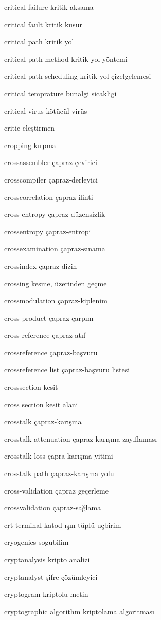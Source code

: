\documentclass[12pt,fleqn]{article}\usepackage{../../common}
\begin{document}
critical failure kritik aksama

critical fault kritik kusur

critical path kritik yol

critical path method kritik yol yöntemi

critical path scheduling kritik yol çizelgelemesi

critical temprature bunalgi sicakligi

critical virus kötücül virüs

critic eleştirmen

cropping kırpma

crossassembler çapraz-çevirici

crosscompiler çapraz-derleyici

crosscorrelation çapraz-ilinti

cross-entropy çapraz düzensizlik

crossentropy çapraz-entropi

crossexamination çapraz-sınama

crossindex çapraz-dizin

crossing kesme, üzerinden geçme

crossmodulation çapraz-kiplenim

cross product çapraz çarpım

cross-reference çapraz atıf

crossreference çapraz-başvuru

crossreference list çapraz-başvuru listesi

crosssection kesit

cross section kesit alani

crosstalk çapraz-karışma

crosstalk attenuation çapraz-karışma zayıflaması

crosstalk loss çapra-karışma yitimi

crosstalk path çapraz-karışma yolu

cross-validation çapraz geçerleme

crossvalidation çapraz-sağlama

crt terminal katod ışın tüplü uçbirim

cryogenics sogubilim

cryptanalysis kripto analizi

cryptanalyst şifre çözümleyici

cryptogram kriptolu metin

cryptographic algorithm kriptolama algoritması
\end{document}
